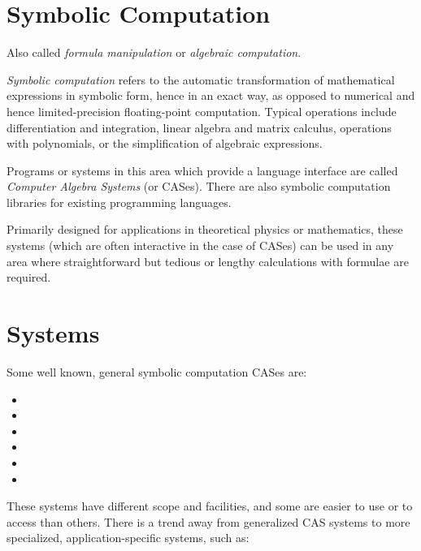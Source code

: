 \documentclass{article}
\begin{document}
\section{Symbolic Computation}

Also called \emph{formula manipulation} or \emph{algebraic computation}.  

\emph{Symbolic computation} refers to the automatic transformation of mathematical expressions in symbolic form, hence in an exact way, as opposed to numerical and hence limited-precision floating-point computation.  Typical operations include differentiation and integration, linear algebra and matrix calculus, operations with polynomials, or the simplification of algebraic expressions.

Programs or systems in this area which provide a language interface are called \emph{Computer Algebra Systems} (or CASes).  There are also symbolic computation libraries for existing programming languages. 

Primarily designed for applications in theoretical physics or mathematics, these systems (which are often interactive in the case of CASes) can be used in any area where straightforward but tedious or lengthy calculations with formulae are required. 

\section{Systems}

Some well known, general symbolic computation CASes are:

\begin{itemize}

\item {}
\item {}
\item {}
\item {}
\item {}
\item {}

\end{itemize}

These systems have different scope and facilities, and some are easier to use or to access than others.  There is a trend away from generalized CAS systems to more specialized, application-specific systems, such as:
\end{document}

